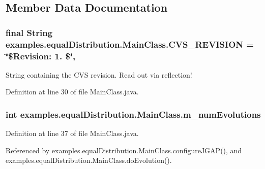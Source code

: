 \subsection{Member Data Documentation}
\hypertarget{classexamples_1_1equal_distribution_1_1_main_class_aa7368cd5647090c117ba9b349fe6fc0a}{
\subsubsection[{C\-V\-S\-\_\-\-R\-E\-V\-I\-S\-I\-O\-N}]{\setlength{\rightskip}{0pt plus 5cm}final String examples.\-equal\-Distribution.\-Main\-Class.\-C\-V\-S\-\_\-\-R\-E\-V\-I\-S\-I\-O\-N = \char`\"{}\$Revision\-: 1. \$\char`\"{}\hspace{0.3cm}{\ttfamily [static]}, {\ttfamily [private]}}}\label{classexamples_1_1equal_distribution_1_1_main_class_aa7368cd5647090c117ba9b349fe6fc0a}
String containing the C\-V\-S revision. Read out via reflection! 

Definition at line 30 of file Main\-Class.\-java.

\hypertarget{classexamples_1_1equal_distribution_1_1_main_class_a79f9fd237de6020b21865b667d3707b0}{
\subsubsection[{m\-\_\-num\-Evolutions}]{\setlength{\rightskip}{0pt plus 5cm}int examples.\-equal\-Distribution.\-Main\-Class.\-m\-\_\-num\-Evolutions\hspace{0.3cm}{\ttfamily [private]}}}\label{classexamples_1_1equal_distribution_1_1_main_class_a79f9fd237de6020b21865b667d3707b0}


Definition at line 37 of file Main\-Class.\-java.



Referenced by examples.\-equal\-Distribution.\-Main\-Class.\-configure\-J\-G\-A\-P(), and examples.\-equal\-Distribution.\-Main\-Class.\-do\-Evolution().

